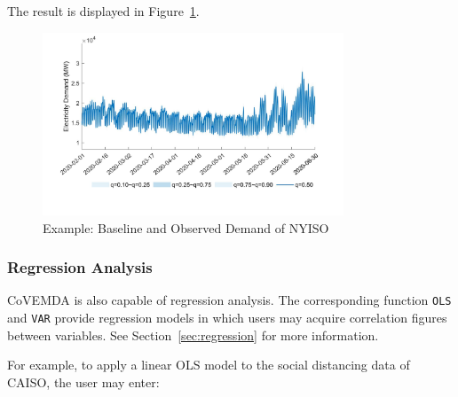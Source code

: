 \documentclass[10pt]{article}
\newcommand{\covemda}{CoVEMDA}
\numberwithin{equation}{section}
\numberwithin{table}{section}
\numberwithin{figure}{section}
\begin{document}
The result is displayed in Figure~\ref{fig:backcast_eg}.

\begin{figure}
  \centering
  \noindent\includegraphics[width=0.8\textwidth]{figures/example_backcast.jpg}
  \caption{Example: Baseline and Observed Demand of NYISO} \label{fig:backcast_eg}
\end{figure}



\subsubsection{Regression Analysis}\label{subsec:eg_regression}

\covemda{} is also capable of regression analysis. The corresponding function \verb!OLS! and \verb!VAR! provide regression models in which users may acquire correlation figures between variables. See Section~\ref{sec:regression} for more information.

For example, to apply a linear OLS model to the social distancing data of CAISO, the user may enter:
\end{document}
